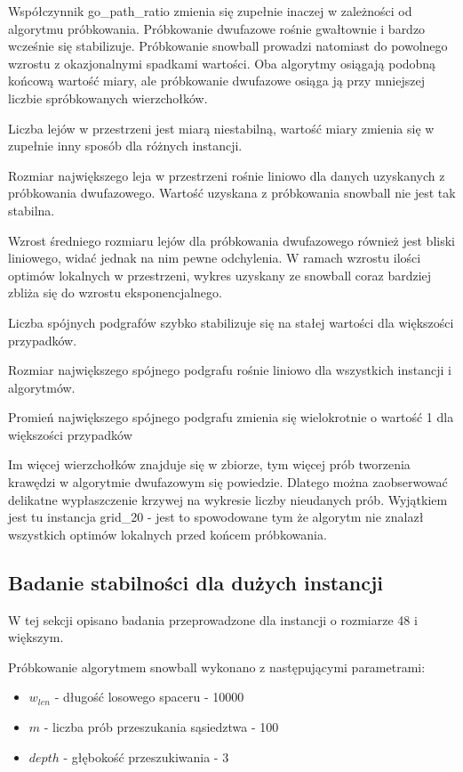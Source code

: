 Współczynnik go\_path\_ratio zmienia się zupełnie inaczej w zależności od algorytmu próbkowania.
Próbkowanie dwufazowe rośnie gwałtownie i bardzo wcześnie się stabilizuje.
Próbkowanie snowball prowadzi natomiast do powolnego wzrostu z okazjonalnymi spadkami wartości.
Oba algorytmy osiągają podobną końcową wartość miary, ale próbkowanie dwufazowe osiąga ją przy mniejszej
liczbie spróbkowanych wierzchołków.

Liczba lejów w przestrzeni jest miarą niestabilną, wartość miary zmienia się w zupełnie inny sposób
dla różnych instancji.

Rozmiar największego leja w przestrzeni rośnie liniowo dla danych uzyskanych z próbkowania
dwufazowego. Wartość uzyskana z próbkowania snowball nie jest tak stabilna.

Wzrost średniego rozmiaru lejów dla próbkowania dwufazowego również jest bliski liniowego,
widać jednak na nim pewne odchylenia. W ramach wzrostu ilości optimów lokalnych w przestrzeni,
wykres uzyskany ze snowball coraz bardziej zbliża się do wzrostu eksponencjalnego.

Liczba spójnych podgrafów szybko stabilizuje się na stałej wartości dla większości przypadków.

Rozmiar największego spójnego podgrafu rośnie liniowo dla wszystkich instancji i algorytmów.

Promień największego spójnego podgrafu zmienia się wielokrotnie o wartość 1 dla większości przypadków

Im więcej wierzchołków znajduje się w zbiorze, tym więcej prób tworzenia krawędzi w algorytmie dwufazowym
się powiedzie. Dlatego można zaobserwować delikatne wypłaszczenie krzywej na wykresie liczby nieudanych prób.
Wyjątkiem jest tu instancja grid\_20  - jest to spowodowane tym że algorytm nie znalazł wszystkich optimów
lokalnych przed końcem próbkowania.

\newpage

\subsection{Badanie stabilności dla dużych instancji}
W tej sekcji opisano badania przeprowadzone dla instancji o rozmiarze 48 i większym.

Próbkowanie algorytmem snowball wykonano z następującymi parametrami:
\begin{itemize}
    \item $w_{len}$ - długość losowego spaceru - 10000
    \item $m$ - liczba prób przeszukania sąsiedztwa - 100
    \item $depth$ - głębokość przeszukiwania - 3
\end{itemize}

